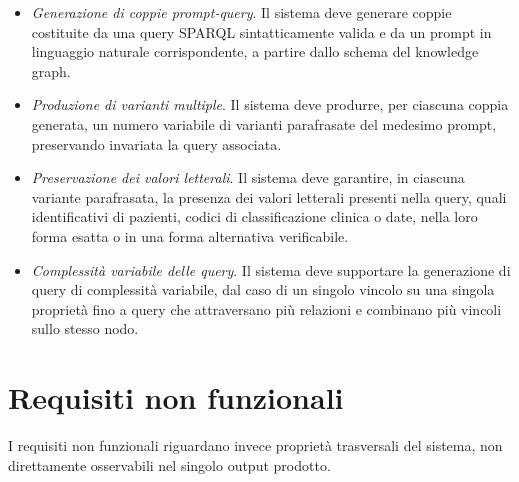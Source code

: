 \documentclass[12pt,a4paper,openright,twoside]{book}
\begin{document}
\begin{itemize}
    \item[\textbf{RF1}]\label{rf:RF1} \textit{Generazione di coppie
              prompt-query}. Il sistema deve generare coppie costituite da una
          query SPARQL sintatticamente valida e da un prompt in linguaggio
          naturale corrispondente, a partire dallo schema del knowledge
          graph.

    \item[\textbf{RF2}]\label{rf:RF2} \textit{Produzione di varianti multiple}.
          Il sistema deve produrre, per ciascuna coppia generata, un numero
          variabile di varianti parafrasate del medesimo prompt, preservando
          invariata la query associata.

    \item[\textbf{RF3}]\label{rf:RF3} \textit{Preservazione dei valori
              letterali}. Il sistema deve garantire, in ciascuna variante
          parafrasata, la presenza dei valori letterali presenti nella
          query, quali identificativi di pazienti, codici di classificazione
          clinica o date, nella loro forma esatta o in una forma alternativa
          verificabile.

    \item[\textbf{RF4}]\label{rf:RF4} \textit{Complessità variabile delle
              query}. Il sistema deve supportare la generazione di query di
          complessità variabile, dal caso di un singolo vincolo su una
          singola proprietà fino a query che attraversano più relazioni e
          combinano più vincoli sullo stesso nodo.
\end{itemize}

\section{Requisiti non funzionali}

I requisiti non funzionali riguardano invece proprietà trasversali del sistema,
non direttamente osservabili nel singolo output prodotto.
\end{document}
